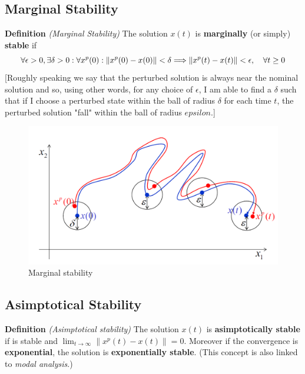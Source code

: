 \vspace{1cm}
\subsection{Marginal Stability}
\noindent
\textbf{Definition} \textit{(Marginal Stability)} The solution $x(t)$ is \textbf{marginally} (or simply) \textbf{stable} if 
\begin{equation*}
    \forall \epsilon>0, \exists \delta>0 : \\
    \forall x^p(0): \lVert x^p(0)-x(0) \rVert < \delta \Longrightarrow   \lVert x^p(t)-x(t) \rVert < \epsilon, \quad \forall t \ge 0
\end{equation*}
\noindent
{
    \color{blue}
    [Roughly speaking we say that the perturbed solution is always near the nominal solution and so, using other words,  for any choice of $\epsilon$, I am able to find a $\delta$ such that if I choose a perturbed state within the ball of radius $\delta$ for each time $t$, the perturbed solution "fall" within the ball of radius $epsilon$.]
}
\begin{figure}[h]
    \centering
    \includegraphics[scale=0.6]{NonLinearControl/images/Stable.png}
    \caption{Marginal stability}
    \label{fig:enter-label}
\end{figure}

\subsection{Asimptotical Stability}
\noindent
\textbf{Definition} \textit{(Asimptotical stability)} The solution $x(t)$ is \textbf{asimptotically stable} if is stable and 
$\lim_{t\to\infty} \lVert x^p(t)-x(t) \rVert=0$. Moreover if the convergence is \textbf{exponential}, the solution is \textbf{exponentially stable}. (This concept is also linked to \textit{modal analysis}.)

